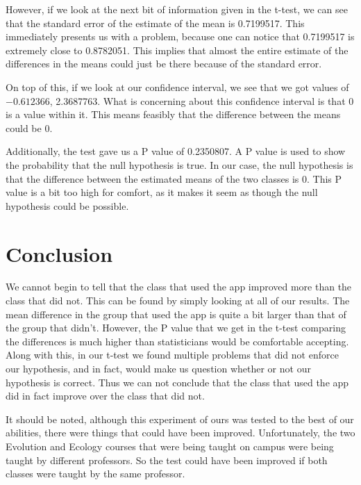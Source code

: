 \documentclass[titlepage]{article}\usepackage[]{graphicx}\usepackage[]{color}
\begin{document}
However, if we look at the next bit of information given in the t-test, we can see that the standard error of the estimate of the mean is 0.7199517. This immediately presents us with a problem, because one can notice that 0.7199517 is extremely close to 0.8782051. This implies that almost the entire estimate of the differences in the means could just be there because of the standard error.

On top of this, if we look at our confidence interval, we see that we got values of \ensuremath{-0.612366}, 2.3687763. What is concerning about this confidence interval is that \(0\) is a value within it. This means feasibly that the difference between the means could be \(0\). 

Additionally, the test gave us a P value of 0.2350807. A P value is used to show the probability that the null hypothesis is true. In our case, the null hypothesis is that the difference between the estimated means of the two classes is \(0\). This P value is a bit too high for comfort, as it makes it seem as though the null hypothesis could be possible. 














\section{Conclusion}

We cannot begin to tell that the class that used the app improved more than the class that did not. This can be found by simply looking at all of our results. The mean difference in the group that used the app is quite a bit larger than that of the group that didn't. However, the P value that we get in the t-test comparing the differences is much higher than statisticians would be comfortable accepting. Along with this, in our t-test we found multiple problems that did not enforce our hypothesis, and in fact, would make us question whether or not our hypothesis is correct. Thus we can not conclude that the class that used the app did in fact improve over the class that did not. 

It should be noted, although this experiment of ours was tested to the best of our abilities, there were things that could have been improved. Unfortunately, the two Evolution and Ecology courses that were being taught on campus were being taught by different professors. So the test could have been improved if both classes were taught by the same professor. 
\end{document}
